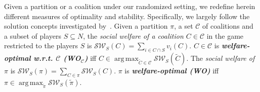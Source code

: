 \documentclass[letterpaper]{article} %
\DeclareMathOperator*{\argmax}{arg\,max}
\begin{document}
Given a partition or a coalition under our randomized setting, we redefine herein different measures of optimality and stability. Specifically, we largely follow the solution concepts investigated by~\cite{peters2016complexity}. %
Given a partition $\pi$, a set $\mathcal{C}$ of coalitions and a subset of players $S \subseteq N$, the \textit{social welfare of a coalition $C \in \mathcal{C}$} in the game restricted to the players $S$ is $\mathcal{SW}_S(C) = \sum_{i \in C \cap S} v_i(C)$. $C \in \mathcal{C}$ is \textit{\textbf{welfare-optimal w.r.t. $\mathbf{\mathcal{C}}$ (WO$\mathbf{_\mathcal{C}}$)}} iff $C \in \argmax_{\tilde{C} \in \mathcal{C}} \mathcal{SW}_S(\tilde{C})$. The \textit{social welfare of $\pi$} is $\mathcal{SW}_S(\pi) = \sum_{C \in \pi} \mathcal{SW}_S(C)$. $\pi$ is \textit{\textbf{welfare-optimal (WO)}} iff $\pi \in \argmax_{\tilde{\pi}} \mathcal{SW}_S(\tilde{\pi})$.
%
\end{document}
